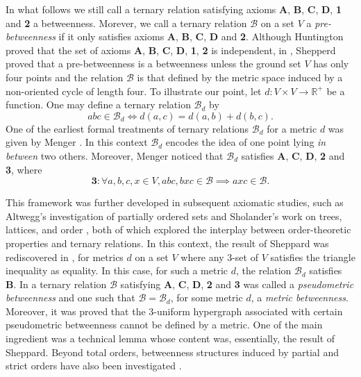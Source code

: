 \documentclass{article}
\newcommand{\calb}{\mathcal{B}}
\begin{document}
In what follows we still call a ternary relation satisfying axioms \textbf{A}, \textbf{B}, \textbf{C}, \textbf{D}, \textbf{1} and \textbf{2} a betweenness. Morever, we call a ternary relation $\calb$ on a set $V$ a \emph{pre-betweenness} if it only satisfies axioms
\textbf{A}, 
\textbf{B}, 
\textbf{C}, 
\textbf{D} and 
\textbf{2}. 
Although Huntington proved that the set of axioms \textbf{A}, 
\textbf{B}, 
\textbf{C}, 
\textbf{D}, 
\textbf{1}, 
\textbf{2} is independent, in \cite{shepperd1956transitivities}, Shepperd proved that a pre-betweenness is a betweenness unless the ground set $V$ has only four points and the relation $\calb$ is that defined by the metric space induced by a non-oriented cycle of length four. To illustrate our point, let $d: V\times V \rightarrow \mathbb{R}^+$ be a function. One may define a ternary relation  $\calb_d$ by $$abc\in\calb_d \Leftrightarrow d(a,c)=d(a,b)+d(b,c).$$ One of the earliest formal treatments of ternary relations  $\calb_d$  for a metric $d$ was given by Menger \cite{menger}. In this  context  $\calb_d$ encodes the idea of one point lying \textit{in between} two others. Moreover, Menger noticed that  $\calb_d$ satisfies \textbf{A}, \textbf{C}, \textbf{D},  \textbf{2} and \textbf{3}, where $$\textbf{3}: \forall a,b,c,x\in V, abc, bxc \in\calb\implies axc\in\calb.$$

This framework was further developed in subsequent axiomatic studies, such as  Altwegg’s investigation of partially ordered sets \cite{altwegg1950axiomatik} and Sholander’s work on trees, lattices, and order \cite{sholander1952trees}, both of which explored the interplay between order-theoretic properties and ternary relations. In this context, the result of Sheppard was rediscovered in \cite{richmondrichmond}, for metrics $d$ on a set $V$ where any 3-set of $V$ satisfies the triangle inequality as equality. In this case,  for such  a metric $d$, the relation  $\calb_d$ satisfies \textbf{B}. In \cite{beaudou2013lines} a ternary relation $\calb$ satisfying \textbf{A}, \textbf{C}, \textbf{D}, \textbf{2} and \textbf{3} was called a \textit{pseudometric betweenness} and one such that $\calb=\calb_d$, for some metric $d$, a  \textit{metric betweenness}. Moreover, it was proved that the 3-uniform hypergraph associated with certain pseudometric betweenness cannot be defined by a metric. One of the main ingredient was a technical lemma whose content was, essentially, the result of Sheppard. Beyond total orders, betweenness structures induced by partial and strict orders have also been investigated \cite{fishburn1971betweenness,Lih,rautenbach2011strict,bankston2013road,courcelle2020betweenness}.
\end{document}
